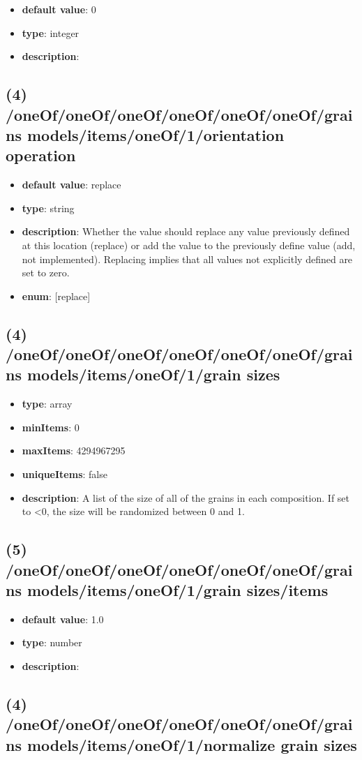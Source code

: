 \begin{itemize}[leftmargin=5em]\item {\bf default value}: 0
\item {\bf type}: integer
\item {\bf description}: 
\end{itemize}\subsection{(4) /oneOf/oneOf/oneOf/oneOf/oneOf/oneOf/grains models/items/oneOf/1/orientation operation}
\begin{itemize}[leftmargin=4em]\item {\bf default value}: replace
\item {\bf type}: string
\item {\bf description}: Whether the value should replace any value previously defined at this location (replace) or add the value to the previously define value (add, not implemented). Replacing implies that all values not explicitly defined are set to zero.
\item {\bf enum}: [replace]\end{itemize}\subsection{(4) /oneOf/oneOf/oneOf/oneOf/oneOf/oneOf/grains models/items/oneOf/1/grain sizes}
\begin{itemize}[leftmargin=4em]\item {\bf type}: array
\item {\bf minItems}: 0
\item {\bf maxItems}: 4294967295
\item {\bf uniqueItems}: false
\item {\bf description}: A list of the size of all of the grains in each composition. If set to <0, the size will be randomized between 0 and 1.
\end{itemize}\subsection{(5) /oneOf/oneOf/oneOf/oneOf/oneOf/oneOf/grains models/items/oneOf/1/grain sizes/items}
\begin{itemize}[leftmargin=5em]\item {\bf default value}: 1.0
\item {\bf type}: number
\item {\bf description}: 
\end{itemize}\subsection{(4) /oneOf/oneOf/oneOf/oneOf/oneOf/oneOf/grains models/items/oneOf/1/normalize grain sizes}
